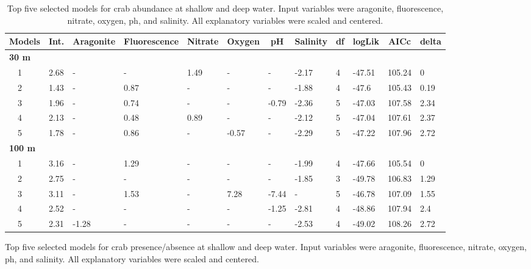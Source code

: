 \documentclass[letterpaper,12pt]{article}\usepackage[]{graphicx}\usepackage[]{color}
\begin{document}
\begin{landscape}
\centering\vspace*{\fill}
\begin{table}[!tbp]
{\scriptsize
\caption{Top five selected models for crab abundance at shallow and deep water. Input variables were aragonite, fluorescence, nitrate, oxygen, ph, and salinity. All explanatory variables were scaled and centered.\label{tab:abutab}} 
\begin{center}
\begin{tabular}{llllllllllll}
\hline\hline
\multicolumn{1}{l}{Models}&\multicolumn{1}{c}{Int.}&\multicolumn{1}{c}{Aragonite}&\multicolumn{1}{c}{Fluorescence}&\multicolumn{1}{c}{Nitrate}&\multicolumn{1}{c}{Oxygen}&\multicolumn{1}{c}{pH}&\multicolumn{1}{c}{Salinity}&\multicolumn{1}{c}{df}&\multicolumn{1}{c}{logLik}&\multicolumn{1}{c}{AICc}&\multicolumn{1}{c}{delta}\tabularnewline
\hline
{\bfseries 30 m}&&&&&&&&&&&\tabularnewline
~~1&2.68&-&-&1.49&-&-&-2.17&4&-47.51&105.24&0\tabularnewline
~~2&1.43&-&0.87&-&-&-&-1.88&4&-47.6&105.43&0.19\tabularnewline
~~3&1.96&-&0.74&-&-&-0.79&-2.36&5&-47.03&107.58&2.34\tabularnewline
~~4&2.13&-&0.48&0.89&-&-&-2.12&5&-47.04&107.61&2.37\tabularnewline
~~5&1.78&-&0.86&-&-0.57&-&-2.29&5&-47.22&107.96&2.72\tabularnewline
\hline
{\bfseries 100 m}&&&&&&&&&&&\tabularnewline
~~1&3.16&-&1.29&-&-&-&-1.99&4&-47.66&105.54&0\tabularnewline
~~2&2.75&-&-&-&-&-&-1.85&3&-49.78&106.83&1.29\tabularnewline
~~3&3.11&-&1.53&-&7.28&-7.44&-&5&-46.78&107.09&1.55\tabularnewline
~~4&2.52&-&-&-&-&-1.25&-2.81&4&-48.86&107.94&2.4\tabularnewline
~~5&2.31&-1.28&-&-&-&-&-2.53&4&-49.02&108.26&2.72\tabularnewline
\hline
\end{tabular}\end{center}}
\end{table}
\begin{table}[!tbp]
{\scriptsize
\caption{Top five selected models for crab presence/absence at shallow and deep water. Input variables were aragonite, fluorescence, nitrate, oxygen, ph, and salinity. All explanatory variables were scaled and centered.\label{tab:patab}} 
}
\end{table}
\end{landscape}
\end{document}
